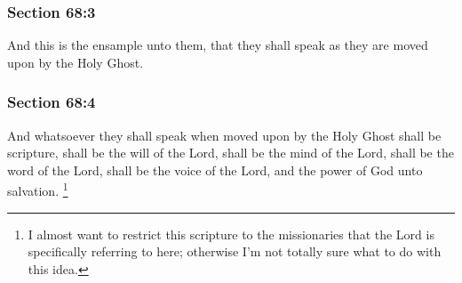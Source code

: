 
	\subsubsection{Section 68:3} %
		\label{DC68-3}

		And this is the ensample unto them, that they shall speak as they are moved upon by the Holy Ghost.


	\subsubsection{Section 68:4} %
		\label{DC68-4}

		And whatsoever they shall speak when moved upon by the Holy Ghost shall be scripture, shall be the will of the Lord, shall be the mind of the Lord, shall be the word of the Lord, shall be the voice of the Lord, and the power of God unto salvation.%
			\footnote{%
				I almost want to restrict this scripture to the missionaries that the Lord is specifically referring to here; otherwise I'm not totally sure what to do with this idea.
				}


